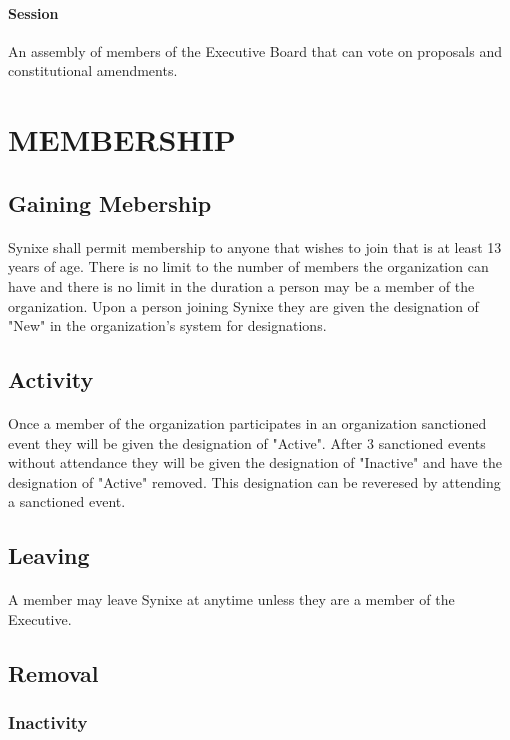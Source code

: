 \documentclass[10pt,a4paper]{article}
\begin{document}
\paragraph{Session} An assembly of members of the Executive Board that can vote on proposals and constitutional amendments.
\section{MEMBERSHIP}
\subsection{Gaining Mebership}
\paragraph{}
Synixe shall permit membership to anyone that wishes to join that is at least 13 years of age. There is no limit to the number of members the organization can have and there is no limit in the duration a person may be a member of the organization. Upon a person joining Synixe they are given the designation of "New" in the organization's system for designations.
\subsection{Activity}
\paragraph{}
Once a member of the organization participates in an organization sanctioned event they will be given the designation of "Active". After 3 sanctioned events without attendance they will be given the designation of "Inactive" and have the designation of "Active" removed.
This designation can be reveresed by attending a sanctioned event.
\subsection{Leaving}
\paragraph{}
A member may leave Synixe at anytime unless they are a member of the Executive.
\subsection{Removal} \label{member-removal}
\subsubsection{Inactivity}
\end{document}
